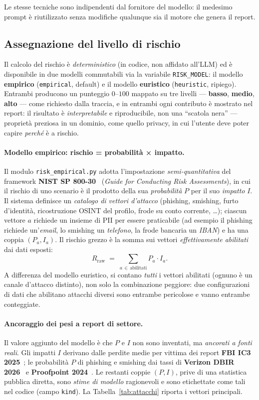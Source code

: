 \documentclass[11pt,a4paper]{article}
\begin{document}
Le stesse tecniche sono indipendenti dal fornitore del modello: il medesimo prompt è
riutilizzato senza modifiche qualunque sia il motore che genera il report.

\subsection{Assegnazione del livello di rischio}
\label{sec:rischio}
Il calcolo del rischio è \emph{deterministico} (in codice, non affidato all'LLM) ed è
disponibile in due modelli commutabili via la variabile \texttt{RISK\_MODEL}: il modello
\textbf{empirico} (\texttt{empirical}, default) e il modello \textbf{euristico}
(\texttt{heuristic}, ripiego). Entrambi producono un punteggio $0$--$100$ mappato su tre
livelli --- \textbf{basso}, \textbf{medio}, \textbf{alto} --- come richiesto dalla traccia,
e in entrambi ogni contributo è mostrato nel report: il risultato è \emph{interpretabile}
e riproducibile, non una ``scatola nera'' --- proprietà preziosa in un dominio, come quello
privacy, in cui l'utente deve poter capire \emph{perché} è a rischio.

\paragraph{Modello empirico: rischio = probabilità × impatto.} Il modulo
\texttt{risk\_empirical.py} adotta l'impostazione \emph{semi-quantitativa} del framework
\textbf{NIST SP 800-30}~\cite{nist80030} (\emph{Guide for Conducting Risk Assessments}), in cui il rischio
di uno scenario è il prodotto della sua \emph{probabilità} $P$ per il suo \emph{impatto}
$I$. Il sistema definisce un \emph{catalogo di vettori d'attacco} (phishing, smishing,
furto d'identità, ricostruzione OSINT del profilo, frode su conto corrente, \ldots);
ciascun vettore $a$ richiede un insieme di PII per essere praticabile (ad esempio il
phishing richiede un'\emph{email}, lo smishing un \emph{telefono}, la frode bancaria un
\emph{IBAN}) e ha una coppia $(P_a, I_a)$. Il rischio grezzo è la somma sui vettori
\emph{effettivamente abilitati} dai dati esposti:
\[
  R_{\text{raw}} \;=\; \textstyle\sum_{a\,\in\,\text{abilitati}} P_a \cdot I_a .
\]
A differenza del modello euristico, si contano \emph{tutti} i vettori abilitati (ognuno è
un canale d'attacco distinto), non solo la combinazione peggiore: due configurazioni di
dati che abilitano attacchi diversi sono entrambe pericolose e vanno entrambe conteggiate.

\paragraph{Ancoraggio dei pesi a report di settore.} Il valore aggiunto del modello è che
$P$ e $I$ non sono inventati, ma \emph{ancorati a fonti reali}. Gli impatti $I$ derivano dalle perdite medie
per vittima dei report \textbf{FBI IC3 2025}~\cite{ic3}; le probabilità $P$ di phishing e smishing dai
tassi di \textbf{Verizon DBIR 2026}~\cite{dbir} e \textbf{Proofpoint 2024}~\cite{proofpoint}. Le restanti coppie $(P,I)$,
prive di una statistica pubblica diretta, sono \emph{stime di modello} ragionevoli e
sono etichettate come tali nel codice (campo \texttt{kind}). 
La Tabella~\ref{tab:attacchi} riporta i vettori principali.
\end{document}
